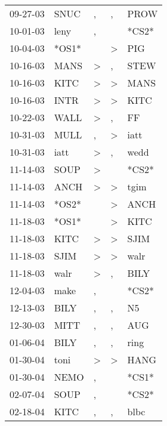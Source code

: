 \begin{supertabular}{lllll}
 09-27-03 &   SNUC &                , &                , &   PROW \\
 10-01-03 &   leny &                , &                  &  *CS2* \\
 10-04-03 &  *OS1* &                  &     \textgreater &    PIG \\
 10-16-03 &   MANS &     \textgreater &                , &   STEW \\
 10-16-03 &   KITC &     \textgreater &     \textgreater &   MANS \\
 10-16-03 &   INTR &     \textgreater &     \textgreater &   KITC \\
 10-22-03 &   WALL &     \textgreater &                , &     FF \\
 10-31-03 &   MULL &                , &     \textgreater &   iatt \\
 10-31-03 &   iatt &     \textgreater &                , &   wedd \\
 11-14-03 &   SOUP &     \textgreater &                  &  *CS2* \\
 11-14-03 &   ANCH &     \textgreater &     \textgreater &   tgim \\
 11-14-03 &  *OS2* &                  &     \textgreater &   ANCH \\
 11-18-03 &  *OS1* &                  &     \textgreater &   KITC \\
 11-18-03 &   KITC &     \textgreater &     \textgreater &   SJIM \\
 11-18-03 &   SJIM &     \textgreater &     \textgreater &   walr \\
 11-18-03 &   walr &     \textgreater &                , &   BILY \\
 12-04-03 &   make &                , &                  &  *CS2* \\
 12-13-03 &   BILY &                , &                , &     N5 \\
 12-30-03 &   MITT &                , &                , &    AUG \\
 01-06-04 &   BILY &                , &                , &   ring \\
 01-30-04 &   toni &     \textgreater &     \textgreater &   HANG \\
 01-30-04 &   NEMO &                , &                  &  *CS1* \\
 02-07-04 &   SOUP &                , &                  &  *CS2* \\
 02-18-04 &   KITC &                , &                , &   blbc \\

\end{supertabular}
